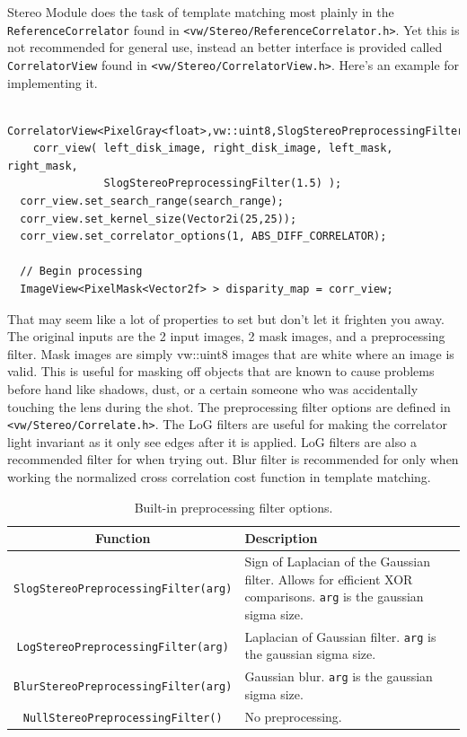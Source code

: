 Stereo Module does the task of template matching most plainly in the
{\tt ReferenceCorrelator} found in {\tt <vw/Stereo/ReferenceCorrelator.h>}.
Yet this is not recommended for
general use, instead an better interface is provided called
{\tt CorrelatorView} found in {\tt <vw/Stereo/CorrelatorView.h>}. Here's an
example for implementing it.

\begin{verbatim}
  CorrelatorView<PixelGray<float>,vw::uint8,SlogStereoPreprocessingFilter>
    corr_view( left_disk_image, right_disk_image, left_mask, right_mask,
               SlogStereoPreprocessingFilter(1.5) );
  corr_view.set_search_range(search_range);
  corr_view.set_kernel_size(Vector2i(25,25));
  corr_view.set_correlator_options(1, ABS_DIFF_CORRELATOR);

  // Begin processing
  ImageView<PixelMask<Vector2f> > disparity_map = corr_view;
\end{verbatim}

That may seem like a lot of properties to set but don't let it
frighten you away. The original inputs are the 2 input images, 2 mask
images, and a preprocessing filter. Mask images are simply vw::uint8
images that are white where an image is valid. This is useful for
masking off objects that are known to cause problems before hand like
shadows, dust, or a certain someone who was accidentally touching the
lens during the shot. The preprocessing filter options are defined in
{\tt <vw/Stereo/Correlate.h>}. The LoG filters are useful for making the
correlator light invariant as it only see edges after it is
applied. LoG filters are also a recommended filter for when trying
out. Blur filter is recommended for only when working the normalized
cross correlation cost function in template matching.

\begin{table}[hbt]\begin{centering}
\begin{tabular}{|c|p{4 in}|} \hline
Function & Description \\ \hline \hline
\verb#SlogStereoPreprocessingFilter(arg)# & Sign of Laplacian of the Gaussian filter. Allows for efficient XOR comparisons. {\tt arg} is the gaussian sigma size. \\ \hline
\verb#LogStereoPreprocessingFilter(arg)# & Laplacian of Gaussian filter. {\tt arg} is the gaussian sigma size. \\ \hline
\verb#BlurStereoPreprocessingFilter(arg)# & Gaussian blur. {\tt arg} is the gaussian sigma size. \\ \hline
\verb#NullStereoPreprocessingFilter()# & No preprocessing. \\ \hline
\end{tabular}
\caption{Built-in preprocessing filter options.}
\label{tbl:preprocessing-filters}
\end{centering}\end{table}

